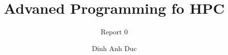 \documentclass[10pt, a4paper]{article}
\title{Advaned Programming fo HPC}
\subtitle{Report 0}
\author{Dinh Anh Duc}
\begin{document}
\maketitle


\begin{itemize}
\end{itemize}
\end{document}
